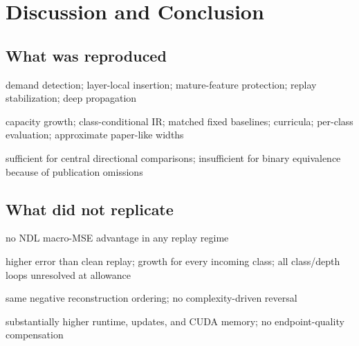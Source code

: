 \section{Discussion and Conclusion}

\subsection{What was reproduced}
\begin{draftpoints}
  \item {}demand detection; layer-local insertion; mature-feature protection; replay stabilization; deep propagation
  \item {}capacity growth; class-conditional IR; matched fixed baselines; curricula; per-class evaluation; approximate paper-like widths
  \item {}sufficient for central directional comparisons; insufficient for binary equivalence because of publication omissions
\end{draftpoints}

\subsection{What did not replicate}
\begin{draftpoints}
  \item {}no NDL macro-MSE advantage in any replay regime
  \item {}higher error than clean replay; growth for every incoming class; all class/depth loops unresolved at allowance
  \item {}same negative reconstruction ordering; no complexity-driven reversal
  \item {}substantially higher runtime, updates, and CUDA memory; no endpoint-quality compensation
\end{draftpoints}

